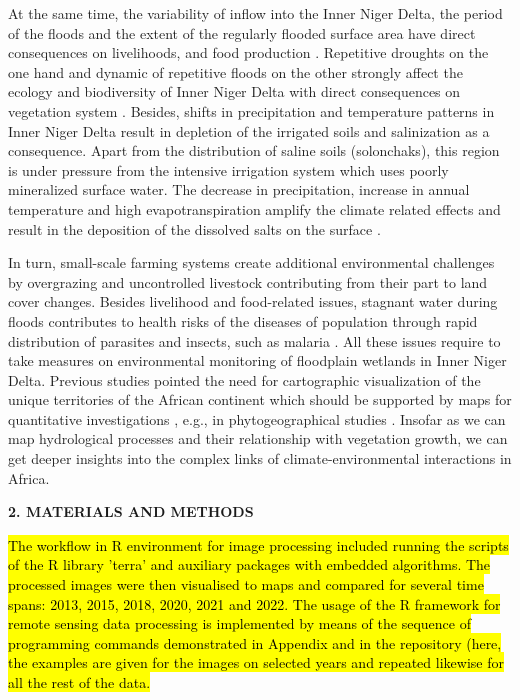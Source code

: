 \documentclass[12pt,a4paper,oneside]{article}
\def \newsection{\vspace{12pt}\textbf}
\def \newpar{\vspace{6pt}}
\begin{document}
\newpar At the same time, the variability of inflow into the Inner Niger Delta, the period of the floods and the extent of the regularly flooded surface area have direct consequences on livelihoods, and food production \citep{LIERSCH201318}. Repetitive droughts on the one hand and dynamic of repetitive floods on the other strongly affect the ecology and biodiversity of Inner Niger Delta with direct consequences on vegetation system \citep{mariko2003caracterisation}. Besides, shifts in precipitation and temperature patterns in Inner Niger Delta result in depletion of the irrigated soils and salinization as a consequence. Apart from the distribution of saline soils (solonchaks), this region is under pressure from the intensive irrigation system which uses poorly mineralized surface water. The decrease in precipitation, increase in annual temperature and high evapotranspiration amplify the climate related effects and result in the deposition of the dissolved salts on the surface \citep{Valenza}. 

\newpar In turn, small-scale farming systems create additional environmental challenges by overgrazing and uncontrolled livestock contributing from their part to land cover changes. Besides livelihood and food-related issues, stagnant water during floods contributes to health risks of the diseases of population through rapid distribution of parasites and insects, such as malaria \citep{COOLS201334,Klinkenberg}. All these issues require to take measures on environmental monitoring of floodplain wetlands in Inner Niger Delta. Previous studies pointed the need for cartographic visualization of the unique territories of the African continent which should be supported by maps for quantitative investigations \citep{Cabot1968}, e.g., in phytogeographical studies \citep{Robequain}. Insofar as we can map hydrological processes and their relationship with vegetation growth, we can get deeper insights into the complex links of climate-environmental interactions in Africa.

\newsection {2. MATERIALS AND METHODS}

\hl{The workflow in R environment for image processing included running the scripts of the R library 'terra' and auxiliary packages with embedded algorithms. The processed images were then visualised to maps and compared for several time spans: 2013, 2015, 2018, 2020, 2021 and 2022. The usage of the R framework for remote sensing data processing is implemented by means of the sequence of programming commands demonstrated in Appendix and in the repository (here, the examples are given for the images on selected years and repeated likewise for all the rest of the data.}
\end{document}
